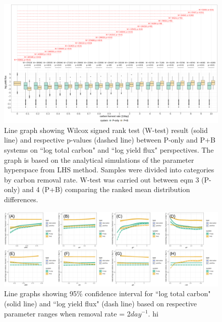 \documentclass[../thesis.tex]{subfiles} %
\begin{document}
\begin{figure}[H]
    \centering
    \includegraphics[width=\linewidth]{../result/Wilcox.png}
    \caption[Wilcox test summary]{Line graph showing Wilcox signed rank test (W-test) result (solid line) and respective p-values (dashed line) between P-only and P+B systems on ``log total carbon" and ``log yield flux" perspectives.  {\scriptsize The graph is based on the analytical simulations of the parameter hyperspace from LHS method.  Samples were divided into categories by carbon removal rate.  W-test was carried out between eqm 3 (P-only) and 4 (P+B) comparing the ranked mean distribution differences.}}
    \label{fig:wilcox}
\end{figure}

\begin{figure}[H]
    \centering
    \includegraphics[width=\linewidth]{../result/var_20.png}
    \caption[95\% distribution for $x=2day^{-1}$]{Line graphs showing 95\% confidence interval for ``log total carbon" (solid line) and ``log yield flux" (dash line) based on respective parameter ranges when removal rate = 2$day^{-1}$.  {\scriptsize hi}}
    \label{fig:v2}
\end{figure}
\end{document}

